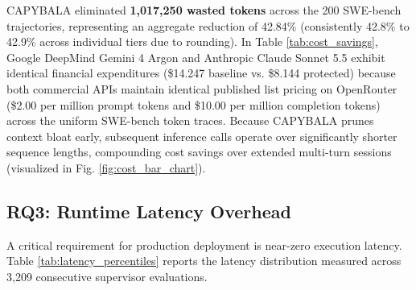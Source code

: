 \documentclass[journal]{IEEEtran}
\begin{document}
CAPYBALA eliminated \textbf{1,017,250 wasted tokens} across the 200 SWE-bench trajectories, representing an aggregate reduction of 42.84\% (consistently 42.8\% to 42.9\% across individual tiers due to rounding). In Table \ref{tab:cost_savings}, Google DeepMind Gemini 4 Argon and Anthropic Claude Sonnet 5.5 exhibit identical financial expenditures (\$14.247 baseline vs. \$8.144 protected) because both commercial APIs maintain identical published list pricing on OpenRouter (\$2.00 per million prompt tokens and \$10.00 per million completion tokens) across the uniform SWE-bench token traces. Because CAPYBALA prunes context bloat early, subsequent inference calls operate over significantly shorter sequence lengths, compounding cost savings over extended multi-turn sessions (visualized in Fig. \ref{fig:cost_bar_chart}).

\subsection{RQ3: Runtime Latency Overhead}

A critical requirement for production deployment is near-zero execution latency. Table \ref{tab:latency_percentiles} reports the latency distribution measured across 3,209 consecutive supervisor evaluations.

\begin{table}[!t]
\caption{Execution Latency Percentiles of CAPYBALA Supervisor across 3,209 Benchmark Execution Turns}
\label{tab:latency_percentiles}
\centering
{}
\end{table}
\end{document}
